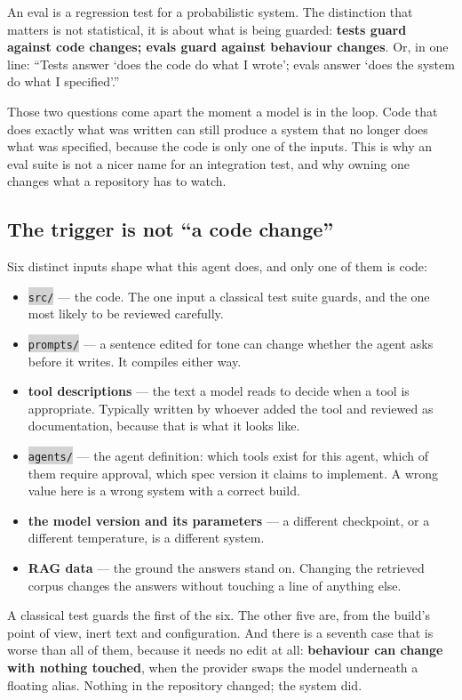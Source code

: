 \documentclass[11pt,a4paper]{article}
\newcommand{\repopath}[1]{\colorbox{lightgray}{\texttt{#1}}}
\begin{document}
An eval is a regression test for a probabilistic system. The distinction that
matters is not statistical, it is about what is being guarded: \textbf{tests
guard against code changes; evals guard against behaviour changes}. Or, in one
line: ``Tests answer `does the code do what I wrote'; evals answer `does the
system do what I specified'.''

Those two questions come apart the moment a model is in the loop. Code that
does exactly what was written can still produce a system that no longer does
what was specified, because the code is only one of the inputs. This is why an
eval suite is not a nicer name for an integration test, and why owning one
changes what a repository has to watch.

\subsection{The trigger is not ``a code change''}

Six distinct inputs shape what this agent does, and only one of them is code:

\begin{itemize}[leftmargin=*]
    \item \repopath{src/} --- the code. The one input a classical test suite
    guards, and the one most likely to be reviewed carefully.
    \item \repopath{prompts/} --- a sentence edited for tone can change
    whether the agent asks before it writes. It compiles either way.
    \item \textbf{tool descriptions} --- the text a model reads to decide when
    a tool is appropriate. Typically written by whoever added the tool and
    reviewed as documentation, because that is what it looks like.
    \item \repopath{agents/} --- the agent definition: which tools exist for
    this agent, which of them require approval, which spec version it claims
    to implement. A wrong value here is a wrong system with a correct build.
    \item \textbf{the model version and its parameters} --- a different
    checkpoint, or a different temperature, is a different system.
    \item \textbf{RAG data} --- the ground the answers stand on. Changing the
    retrieved corpus changes the answers without touching a line of anything
    else.
\end{itemize}

A classical test guards the first of the six. The other five are, from the
build's point of view, inert text and configuration. And there is a seventh
case that is worse than all of them, because it needs no edit at all:
\textbf{behaviour can change with nothing touched}, when the provider swaps
the model underneath a floating alias. Nothing in the repository changed;
the system did.
\end{document}
